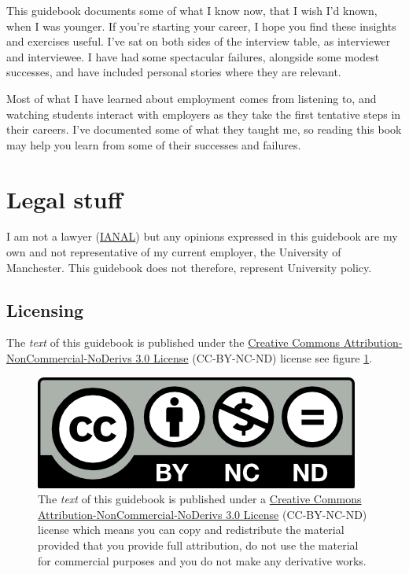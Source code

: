 \documentclass[
]{book}
\begin{document}
This guidebook documents some of what I know now, that I wish I'd known, when I was younger. If you're starting your career, I hope you find these insights and exercises useful. I've sat on both sides of the interview table, as interviewer and interviewee. I have had some spectacular failures, alongside some modest successes, and have included personal stories where they are relevant.

Most of what I have learned about employment comes from listening to, and watching students interact with employers as they take the first tentative steps in their careers. I've documented some of what they taught me, so reading this book may help you learn from some of their successes and failures.

\hypertarget{legal}{%
\section{Legal stuff}\label{legal}}

I am not a lawyer (\href{https://en.wikipedia.org/wiki/IANAL}{IANAL}) but any opinions expressed in this guidebook are my own and not representative of my current employer, the University of Manchester. This guidebook does not therefore, represent University policy.

\hypertarget{license}{%
\subsection{Licensing}\label{license}}

The \emph{text} of this guidebook is published under the \href{https://creativecommons.org/licenses/by-nc-nd/3.0/}{Creative Commons Attribution-NonCommercial-NoDerivs 3.0 License} (CC-BY-NC-ND) license see figure \ref{fig:cc-by-nc-nd-fig}.

\begin{figure}

{\centering \includegraphics[width=1\linewidth]{images/by-nc-nd} 

}

\caption{The \emph{text} of this guidebook is published under a \href{https://creativecommons.org/licenses/by-nc-nd/3.0/}{Creative Commons Attribution-NonCommercial-NoDerivs 3.0 License} (CC-BY-NC-ND) license which means you can copy and redistribute the material provided that you provide full attribution, do not use the material for commercial purposes and you do not make any derivative works.}\label{fig:cc-by-nc-nd-fig}
\end{figure}
\end{document}
